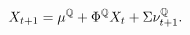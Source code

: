 \begin{equation} \label{eq:nXvarsQ}
	X_{t+1} = \mu^{\mathbb{Q}} + \Phi^{\mathbb{Q}} X_{t}  + \Sigma \nu_{t+1}^{\mathbb{Q}}.
\end{equation}